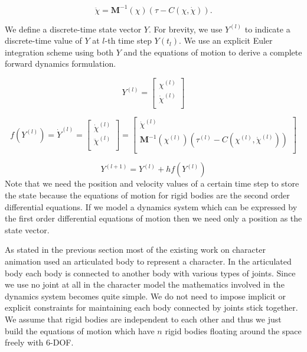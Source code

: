 \documentclass[a4paper,10pt]{article}
\begin{document}
\begin{equation}
\ddot\chi =\mathbf{M}^{-1}(\chi) ( \tau - C(\chi,\dot\chi) ).
\end{equation}

We define a discrete-time state vector $Y$. For brevity, we use $Y^{(l)}$
to indicate a discrete-time value of $Y$ at $l$-th time step $Y(t_l)$.
We use an explicit Euler integration
scheme using both $Y$ and the equations of motion to derive a complete
forward dynamics formulation.

\begin{equation}
Y^{(l)} =
\left[ {\begin{array}{cc}
 \chi^{(l)}   \\
 \dot\chi^{(l)}   \\
 \end{array} } \right]
\end{equation}

\begin{equation}
f(Y^{(l)})=\dot{Y}^{(l)}
=
\left[ {\begin{array}{cc}
 \dot\chi^{(l)}   \\
 \ddot\chi^{(l)}   \\
 \end{array} } \right]
 =
\left[ {\begin{array}{cc}
 \dot\chi^{(l)}   \\
 \mathbf{M}^{-1}(\chi^{(l)}) ( \tau^{(l)} - C(\chi^{(l)},\dot\chi^{(l)}) )   \\
 \end{array} } \right]
\end{equation}

\begin{equation}
Y^{(l+1)}=Y^{(l)}+hf(Y^{(l)})
\end{equation}
Note that we need the position and velocity values of a certain time step
to store the state because the equations of motion for rigid bodies
are the second order differential equations.
If we model a dynamics system
which can be expressed by the first order differential equations of motion
then we need only a position as the state vector.



As stated in the previous section most of the existing work on
character animation used an articulated body to represent a character.
In the articulated body each body is connected to another body with
various types of joints. Since we use no joint at all in the character
model the mathematics involved in the dynamics system becomes quite
simple. We do not need to impose implicit or explicit constraints for
maintaining each body connected by joints stick together.
We assume that rigid bodies are independent to each other and thus we just build the
equations of motion which have $n$ rigid bodies floating around the
space freely with 6-DOF.
\end{document}
